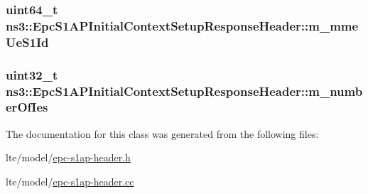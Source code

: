 \subsubsection[{\texorpdfstring{m\+\_\+mme\+Ue\+S1\+Id}{m_mmeUeS1Id}}]{\setlength{\rightskip}{0pt plus 5cm}uint64\+\_\+t ns3\+::\+Epc\+S1\+A\+P\+Initial\+Context\+Setup\+Response\+Header\+::m\+\_\+mme\+Ue\+S1\+Id\hspace{0.3cm}{\ttfamily [private]}}\hypertarget{classns3_1_1EpcS1APInitialContextSetupResponseHeader_abe6b8ad648a51caea3869046a89998be}{}\label{classns3_1_1EpcS1APInitialContextSetupResponseHeader_abe6b8ad648a51caea3869046a89998be}
\subsubsection[{\texorpdfstring{m\+\_\+number\+Of\+Ies}{m_numberOfIes}}]{\setlength{\rightskip}{0pt plus 5cm}uint32\+\_\+t ns3\+::\+Epc\+S1\+A\+P\+Initial\+Context\+Setup\+Response\+Header\+::m\+\_\+number\+Of\+Ies\hspace{0.3cm}{\ttfamily [private]}}\hypertarget{classns3_1_1EpcS1APInitialContextSetupResponseHeader_ac173d56839c2071d3b246e4b2a9fb8f2}{}\label{classns3_1_1EpcS1APInitialContextSetupResponseHeader_ac173d56839c2071d3b246e4b2a9fb8f2}


The documentation for this class was generated from the following files\+:\begin{DoxyCompactItemize}
\item 
lte/model/\hyperlink{epc-s1ap-header_8h}{epc-\/s1ap-\/header.\+h}\item 
lte/model/\hyperlink{epc-s1ap-header_8cc}{epc-\/s1ap-\/header.\+cc}\end{DoxyCompactItemize}
